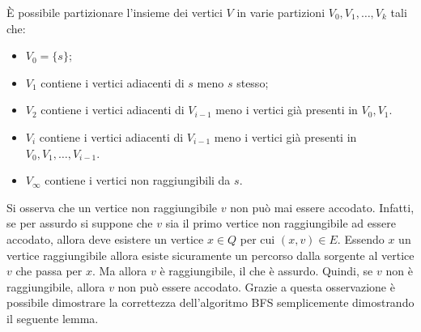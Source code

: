 \begin{propbox}[Proprietà C]
	È possibile partizionare l'insieme dei vertici $V$ in varie partizioni $V_{0},V_{1},\ldots,V_{k}$ tali che:
	\begin{itemize}
		\item $V_{0} = \{s\}$;
		\item $V_{1}$ contiene i vertici adiacenti di $s$ meno $s$ stesso;
		\item $V_{2}$ contiene i vertici adiacenti di $V_{i-1}$ meno i vertici già presenti in $V_{0},V_{1}$.
		\item $V_{i}$ contiene i vertici adiacenti di $V_{i-1}$ meno i vertici già presenti in $V_{0},V_{1},\ldots,V_{i-1}$.
		\item $V_{\infty}$ contiene i vertici non raggiungibili da $s$.
	\end{itemize}
\end{propbox}

Si osserva che un vertice non raggiungibile $v$ non può mai essere accodato. Infatti, se per assurdo si suppone che $v$ sia il primo vertice non raggiungibile ad essere accodato, allora deve esistere un vertice $x \in Q$ per cui $(x,v) \in E$. Essendo $x$ un vertice raggiungibile allora esiste sicuramente un percorso dalla sorgente al vertice $v$ che passa per $x$. Ma allora $v$ è raggiungibile, il che è assurdo. Quindi, se $v$ non è raggiungibile, allora $v$ non può essere accodato. Grazie a questa osservazione è possibile dimostrare la correttezza dell'algoritmo \textsc{BFS} semplicemente dimostrando il seguente lemma.

